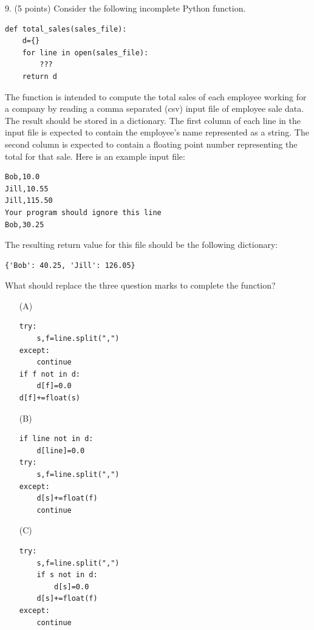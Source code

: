 \documentclass{article}
\newcounter{question}
\begin{document}
\noindent
\begin{minipage}{\textwidth}
9. (5 points)
Consider the following incomplete Python function.
\begin{verbatim}
def total_sales(sales_file):
    d={}
    for line in open(sales_file):
        ???
    return d
\end{verbatim}
The function is intended to compute the total sales of each employee working for a company by reading a comma separated (csv) input file of employee sale data. The result should be stored in a dictionary. The first column of each line in the input file is expected to contain the employee's name represented as a string. The second column is expected to contain a floating point number representing the total for that sale. Here is an example input file:
\begin{verbatim}
Bob,10.0
Jill,10.55
Jill,115.50
Your program should ignore this line
Bob,30.25
\end{verbatim}
The resulting return value for this file should be the following dictionary:
\begin{verbatim}
{'Bob': 40.25, 'Jill': 126.05}
\end{verbatim}
What should replace the three question marks to complete the function?

\begin{enumerate}
\item[(A)]
\begin{verbatim}
try:
    s,f=line.split(",")
except:
    continue
if f not in d:
    d[f]=0.0
d[f]+=float(s)
\end{verbatim}

\item[(B)]
\begin{verbatim}
if line not in d:
    d[line]=0.0
try:
    s,f=line.split(",")
except:
    d[s]+=float(f)
    continue
\end{verbatim}

\item[(C)]
\begin{verbatim}
try:
    s,f=line.split(",")
    if s not in d:
        d[s]=0.0
    d[s]+=float(f)
except:
    continue
\end{verbatim}

\end{enumerate}
\end{minipage}
\vspace{10em}
\filbreak\vfil{}\vfilneg
\end{document}

